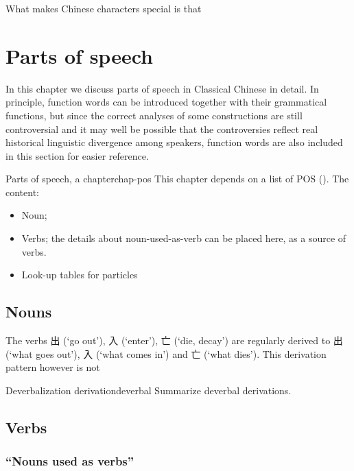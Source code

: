 \documentclass[UTF8, a4paper, oneside, scheme=plain, 12pt]{ctexrep}
\newcommand{\translate}[1]{`#1'}
\begin{document}
What makes Chinese characters special is that 

\chapter{Parts of speech}

In this chapter we discuss parts of speech in Classical Chinese in detail.
In principle, function words can be introduced together with their grammatical functions,
but since the correct analyses of some constructions are still controversial
and it may well be possible that the controversies reflect
real historical linguistic divergence among speakers,
function words are also included in this section for easier reference.

\begin{todobox}{Parts of speech, a chapter}{chap-pos}
    This chapter depends on a list of POS ().
    The content:
    \begin{itemize}
        \item Noun; 
        \item Verbs; the details about noun-used-as-verb can be placed here, as a source of verbs.
        \item Look-up tables for particles
    \end{itemize}
\end{todobox}

\section{Nouns}


The verbs 出 (\translate{go out}), 入 (\translate{enter}), 亡 (\translate{die, decay})
are regularly derived to 出 (\translate{what goes out}), 入 (\translate{what comes in})
and 亡 (\translate{what dies}).
This derivation pattern however is not 

\begin{todobox}{Deverbalization derivation}{deverbal}
    Summarize deverbal derivations.  
\end{todobox}

\section{Verbs}

\subsection{``Nouns used as verbs''}\label{sec:pos.verb.noun-to-verb}
\end{document}
